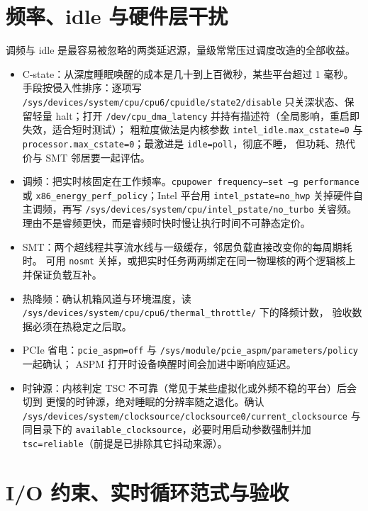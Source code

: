\documentclass[12pt,a4paper,fontset=fandol]{ctexbook}
\newcommand{\Tp}[1]{\texttt{#1}}
\newcommand{\Bk}{\discretionary{}{}{}}
\begin{document}
\section{频率、idle 与硬件层干扰}
\label{sec:ch08-frequency}

调频与 idle 是最容易被忽略的两类延迟源，量级常常压过调度改造的全部收益。

\begin{itemize}
  \item C-state：从深度睡眠唤醒的成本是几十到上百微秒，某些平台超过 1 毫秒。
        手段按侵入性排序：逐项写
        \Tp{/sys/devices/system/cpu/cpu6/cpuidle/state2/disable}
        只关深状态、保留轻量 halt；打开 \Tp{/dev/cpu\_dma\_latency}
        并持有描述符（全局影响，重启即失效，适合短时测试）；
        粗粒度做法是内核参数 \Tp{intel\_idle.max\_cstate=0}
        与 \Tp{processor.max\_cstate=0}；最激进是 \Tp{idle=poll}，彻底不睡，
        但功耗、热代价与 SMT 邻居要一起评估。
  \item 调频：把实时核固定在工作频率。\Tp{cpupower frequency--{\Bk}set --{\Bk}g performance}
        或 \Tp{x86\_{\Bk}energy\_{\Bk}perf\_{\Bk}policy}；Intel 平台用 \Tp{intel\_{\Bk}pstate=no\_{\Bk}hwp}
        关掉硬件自主调频，再写 \Tp{/sys/devices/system/cpu/intel\_{\Bk}pstate/no\_{\Bk}turbo}
        关睿频。理由不是睿频更快，而是睿频时快时慢让执行时间不可静态定价。
  \item SMT：两个超线程共享流水线与一级缓存，邻居负载直接改变你的每周期耗时。
        可用 \Tp{nosmt} 关掉，或把实时任务两两绑定在同一物理核的两个逻辑核上
        并保证负载互补。
  \item 热降频：确认机箱风道与环境温度，读
        \Tp{/{\Bk}sys{\Bk}/devices{\Bk}/system{\Bk}/cpu{\Bk}/cpu6{\Bk}/thermal\_{\Bk}throttle/} 下的降频计数，
        验收数据必须在热稳定之后取。
  \item PCIe 省电：\Tp{pcie\_{\Bk}aspm=off} 与
        \Tp{/sys/{\Bk}module/{\Bk}pcie\_aspm/{\Bk}parameters/{\Bk}policy} 一起确认；
        ASPM 打开时设备唤醒时间会加进中断响应延迟。
  \item 时钟源：内核判定 TSC 不可靠（常见于某些虚拟化或外频不稳的平台）后会切到
        更慢的时钟源，绝对睡眠的分辨率随之退化。确认
        \Tp{/sys/{\Bk}devices/{\Bk}system/{\Bk}clocksource/{\Bk}clocksource0/current\_{\Bk}clocksource}
        与同目录下的 \Tp{available\_{\Bk}clocksource}，必要时用启动参数强制并加
        \Tp{tsc=reliable}（前提是已排除其它抖动来源）。
\end{itemize}

\section{I/O 约束、实时循环范式与验收}
\label{sec:ch08-io-loop}
\end{document}
